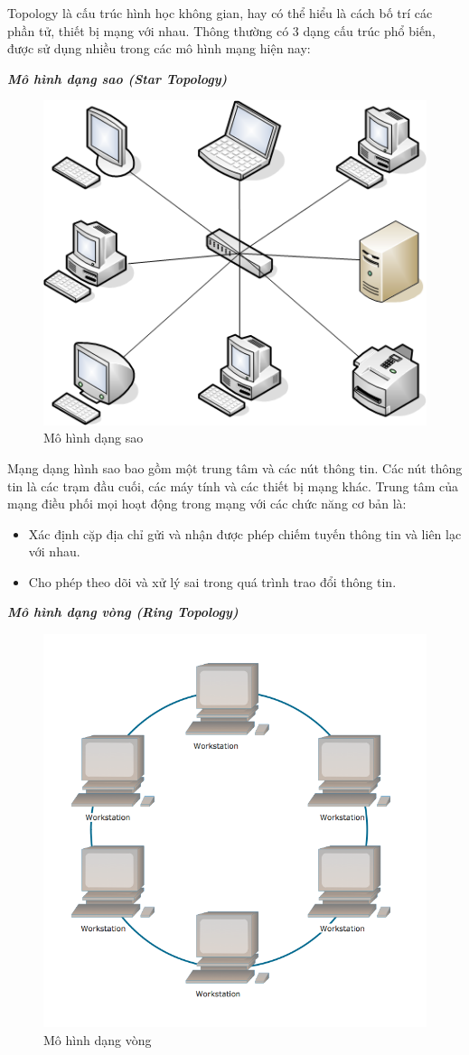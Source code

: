 Topology là cấu trúc hình học không gian, hay có thể hiểu là cách bố trí các phần tử, thiết bị mạng với nhau. Thông thường có 3 dạng cấu trúc phổ biến, được sử dụng nhiều trong các mô hình mạng hiện nay:

\textbf{\textit{Mô hình dạng sao (Star Topology)}}

\begin{figure}[htbp]
    \centering
    \includegraphics[width=0.4\linewidth]{img/Star_Topology.png}
    \caption{Mô hình dạng sao}
\end{figure}
Mạng dạng hình sao bao gồm một trung tâm và các nút thông tin. Các nút thông tin là các trạm đầu cuối, các máy tính và các thiết bị mạng khác. Trung tâm của mạng điều phối mọi hoạt động trong mạng với các chức năng cơ bản là:

\begin{itemize}[left=2cm]
    \item  Xác định cặp địa chỉ gửi và nhận được phép chiếm tuyến thông tin và liên lạc với nhau.
    \item Cho phép theo dõi và xử lý sai trong quá trình trao đổi thông tin.
\end{itemize}

\textbf{\textit{Mô hình dạng vòng (Ring Topology)}}

\begin{figure}[htbp]
    \centering
    \includegraphics[width=0.4\linewidth]{img/Ring-Topology.png}
    \caption{Mô hình dạng vòng}
\end{figure}

